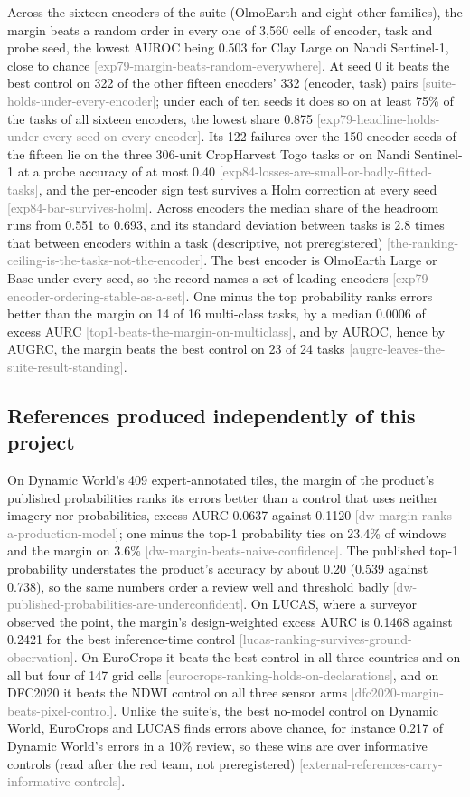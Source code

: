 \documentclass[11pt,a4paper]{article}
\newcommand{\claim}[1]{{\scriptsize\textsf{\textcolor{gray}{[#1]}}}}
\begin{document}
Across the sixteen encoders of the suite (OlmoEarth and eight other families), the margin beats a random order in
every one of 3,560 cells of encoder, task and probe seed, the lowest AUROC being 0.503 for Clay Large on Nandi
Sentinel-1, close to chance \claim{exp79-margin-beats-random-everywhere}. At seed 0 it beats the best control on 322 of
the other fifteen encoders' 332 (encoder, task) pairs \claim{suite-holds-under-every-encoder}; under each of ten seeds
it does so on at least 75\% of the tasks of all sixteen encoders, the lowest share 0.875
\claim{exp79-headline-holds-under-every-seed-on-every-encoder}. Its 122 failures over the 150 encoder-seeds of the
fifteen lie on the three 306-unit CropHarvest Togo tasks or on Nandi Sentinel-1 at a probe accuracy of at most 0.40
\claim{exp84-losses-are-small-or-badly-fitted-tasks}, and the per-encoder sign test survives a Holm correction at
every seed \claim{exp84-bar-survives-holm}. Across encoders the median share of the headroom runs from 0.551 to 0.693,
and its standard deviation between tasks is 2.8 times that between encoders within a task (descriptive, not
preregistered) \claim{the-ranking-ceiling-is-the-tasks-not-the-encoder}. The best encoder is OlmoEarth Large or Base under every seed,
so the record names a set of leading encoders \claim{exp79-encoder-ordering-stable-as-a-set}. One minus the top
probability ranks errors better than the margin on 14 of 16 multi-class tasks, by a median 0.0006 of excess AURC
\claim{top1-beats-the-margin-on-multiclass}, and by AUROC, hence by AUGRC, the margin beats the best control on 23 of
24 tasks \claim{augrc-leaves-the-suite-result-standing}.

\subsection{References produced independently of this project}

On Dynamic World's 409 expert-annotated tiles, the margin of the product's published probabilities ranks its errors
better than a control that uses neither imagery nor probabilities, excess AURC 0.0637 against 0.1120
\claim{dw-margin-ranks-a-production-model}; one minus the top-1 probability ties on 23.4\% of windows and the margin on
3.6\% \claim{dw-margin-beats-naive-confidence}. The published top-1 probability understates the product's accuracy by
about 0.20 (0.539 against 0.738), so the same numbers order a review well and threshold badly
\claim{dw-published-probabilities-are-underconfident}. On LUCAS, where a surveyor observed the point, the margin's
design-weighted excess AURC is 0.1468 against 0.2421 for the best inference-time control
\claim{lucas-ranking-survives-ground-observation}. On EuroCrops it beats the best control in all three countries and on
all but four of 147 grid cells \claim{eurocrops-ranking-holds-on-declarations}, and on DFC2020 it beats the NDWI control
on all three sensor arms \claim{dfc2020-margin-beats-pixel-control}. Unlike the suite's, the best no-model control on
Dynamic World, EuroCrops and LUCAS finds errors above chance, for instance 0.217 of Dynamic World's errors in a 10\%
review, so these wins are over informative controls (read after the red team, not preregistered)
\claim{external-references-carry-informative-controls}.
\end{document}
